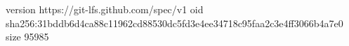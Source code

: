 version https://git-lfs.github.com/spec/v1
oid sha256:31bddb6d4ca88c11962cd88530dc5fd3e4ee34718c95faa2c3e4ff3066b4a7e0
size 95985
